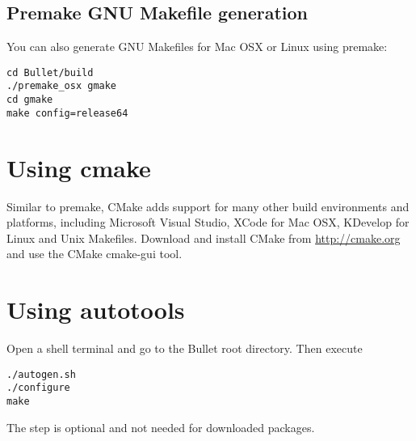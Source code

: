 \subsection{Premake GNU Makefile generation}
You can also generate GNU Makefiles for Mac OSX or Linux using premake:
\begin{lstlisting}[caption=Premake to GNU Makefile, label=premake_make]
cd Bullet/build
./premake_osx gmake
cd gmake
make config=release64
\end{lstlisting}
\section{Using cmake}
Similar to premake, CMake adds support for many other build environments and platforms, including Microsoft Visual Studio, XCode for Mac OSX, KDevelop for Linux and Unix Makefiles. Download and install CMake from \url{http://cmake.org} and use the CMake cmake-gui tool.
\section{Using autotools}
Open a shell terminal and go to the Bullet root directory. Then execute
\begin{lstlisting}[caption=autotools to Makefile, label=autotools_make]
./autogen.sh
./configure
make
\end{lstlisting}
The  step is optional and not needed for downloaded packages.
